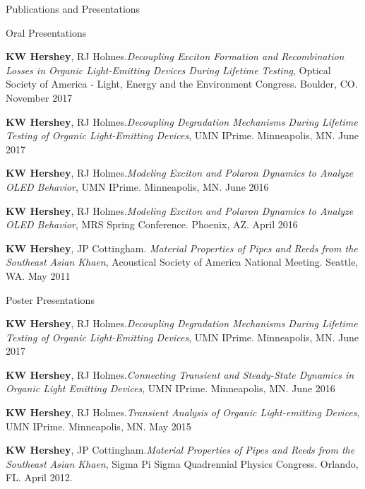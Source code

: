 \documentclass{resume} %
\begin{document}
\begin{rSection}{Publications and Presentations}
\begin{rSubsection}{Oral Presentations}{}{}{}
\item \textbf{KW Hershey}, RJ Holmes.{\em Decoupling Exciton Formation and Recombination Losses in Organic Light-Emitting Devices During Lifetime Testing}, Optical Society of America - Light, Energy and the Environment Congress. Boulder, CO. November 2017
\item \textbf{KW Hershey}, RJ Holmes.{\em Decoupling Degradation Mechanisms During Lifetime Testing of Organic Light-Emitting Devices}, UMN IPrime. Minneapolis, MN. June 2017 
\item \textbf{KW Hershey}, RJ Holmes.{\em Modeling Exciton and Polaron Dynamics to Analyze OLED Behavior}, UMN IPrime. Minneapolis, MN. June 2016 
\item \textbf{KW Hershey}, RJ Holmes.{\em Modeling Exciton and Polaron Dynamics to Analyze OLED Behavior}, MRS Spring Conference. Phoenix, AZ. April 2016 
\item \textbf{KW Hershey}, JP Cottingham. {\em Material Properties of Pipes and Reeds from the Southeast Asian Khaen}, Acoustical Society of America National Meeting. Seattle, WA. May 2011 
\end{rSubsection}
\begin{rSubsection}{Poster Presentations}{}{}{}
\item \textbf{KW Hershey}, RJ Holmes.{\em Decoupling Degradation Mechanisms During Lifetime Testing of Organic Light-Emitting Devices}, UMN IPrime. Minneapolis, MN. June 2017 
\item \textbf{KW Hershey}, RJ Holmes.{\em Connecting Transient and Steady-State Dynamics in Organic Light Emitting Devices}, UMN IPrime. Minneapolis, MN. June 2016 
\item \textbf{KW Hershey}, RJ Holmes.{\em Transient Analysis of Organic Light-emitting Devices}, UMN IPrime. Minneapolis, MN. May 2015 
\item \textbf{KW Hershey}, JP Cottingham.{\em Material Properties of Pipes and Reeds from the Southeast Asian Khaen}, Sigma Pi Sigma Quadrennial Physics Congress. Orlando, FL. April 2012.

\end{rSubsection}
\end{rSection}
\end{document}
